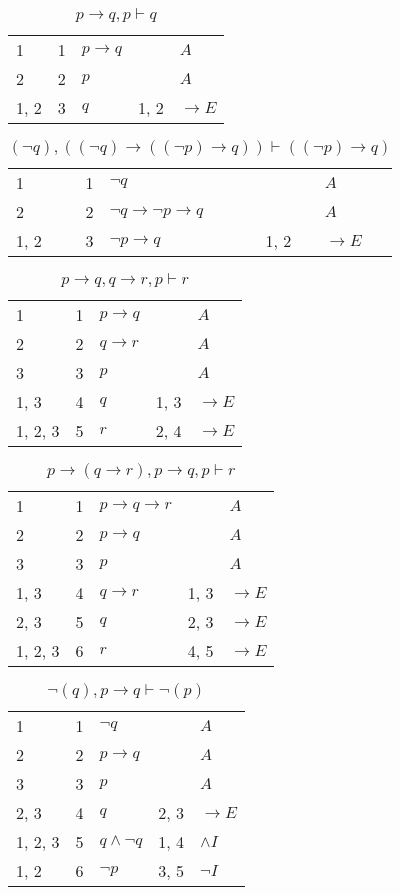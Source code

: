 \documentclass{article}
\begin{document}
\begin{table}[htbp]\caption*{$p→q,p ⊢ q$}\centering\begin{tabular}{lrlll}
{1} & 1 & $p→q$ & {} & $A$ \\
{2} & 2 & $p$ & {} & $A$ \\
{1, 2} & 3 & $q$ & {1, 2} & $→E$ \\
\end{tabular}
\end{table}
\begin{table}[htbp]\caption*{$(¬q),((¬q)→((¬p)→q)) ⊢ ((¬p)→q)$}\centering\begin{tabular}{lrlll}
{1} & 1 & $¬q$ & {} & $A$ \\
{2} & 2 & $¬q→ ¬p→q$ & {} & $A$ \\
{1, 2} & 3 & $¬p→q$ & {1, 2} & $→E$ \\
\end{tabular}
\end{table}
\begin{table}[htbp]\caption*{$p→q,q→r,p ⊢ r$}\centering\begin{tabular}{lrlll}
{1} & 1 & $p→q$ & {} & $A$ \\
{2} & 2 & $q→r$ & {} & $A$ \\
{3} & 3 & $p$ & {} & $A$ \\
{1, 3} & 4 & $q$ & {1, 3} & $→E$ \\
{1, 2, 3} & 5 & $r$ & {2, 4} & $→E$ \\
\end{tabular}
\end{table}
\begin{table}[htbp]\caption*{$p→(q→r),p→q,p ⊢ r$}\centering\begin{tabular}{lrlll}
{1} & 1 & $p→q→r$ & {} & $A$ \\
{2} & 2 & $p→q$ & {} & $A$ \\
{3} & 3 & $p$ & {} & $A$ \\
{1, 3} & 4 & $q→r$ & {1, 3} & $→E$ \\
{2, 3} & 5 & $q$ & {2, 3} & $→E$ \\
{1, 2, 3} & 6 & $r$ & {4, 5} & $→E$ \\
\end{tabular}
\end{table}
\begin{table}[htbp]\caption*{$¬(q),p→q ⊢ ¬(p)$}\centering\begin{tabular}{lrlll}
{1} & 1 & $¬q$ & {} & $A$ \\
{2} & 2 & $p→q$ & {} & $A$ \\
{3} & 3 & $p$ & {} & $A$ \\
{2, 3} & 4 & $q$ & {2, 3} & $→E$ \\
{1, 2, 3} & 5 & $q∧ ¬q$ & {1, 4} & $∧I$ \\
{1, 2} & 6 & $¬p$ & {3, 5} & $¬I$ \\
\end{tabular}
\end{table}
\end{document}

